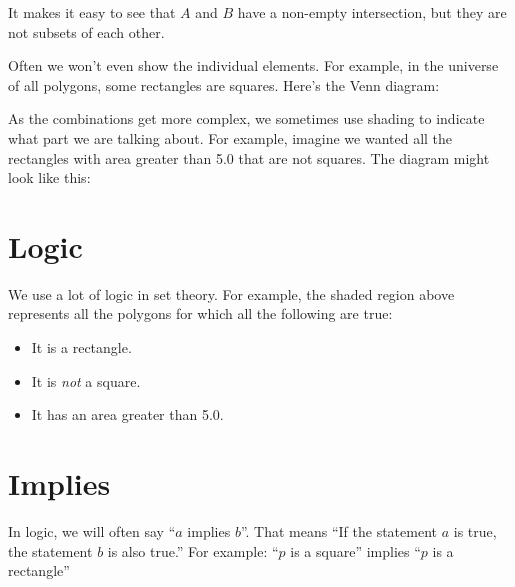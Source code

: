 It makes it easy to see that $A$ and $B$ have a non-empty
intersection, but they are not subsets of each other.

Often we won't even show the individual elements. For example, in the
universe of all polygons, some rectangles are squares. Here's the Venn diagram:


As the combinations get more complex, we sometimes use shading to
indicate what part we are talking about.  For example, imagine we
wanted all the rectangles with area greater than 5.0 that are not
squares.  The diagram might look like this:



\section{Logic}

We use a lot of logic in set theory.  For example, the shaded region
above represents all the polygons for which all the following are
true:
\begin{itemize}
\item It is a rectangle.
\item It is \textit{not} a square.
\item It has an area greater than 5.0.
\end{itemize}

\section{Implies}

In logic, we will often say ``$a$ implies $b$''.  That means ``If the
statement $a$ is true, the statement $b$ is also true.''  For example:
``$p$ is a square'' implies ``$p$ is a rectangle''


